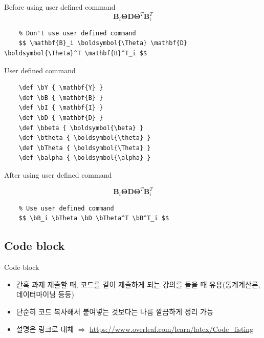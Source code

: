 \documentclass{beamer}
\begin{document}
\begin{frame}[fragile]{Before using user defined command}
	$$ \mathbf{B}_i\boldsymbol{\Theta}\mathbf{D}\boldsymbol{\Theta}^T\mathbf{B}^T_i $$
	
	\begin{lstlisting}
	% Don't use user defined command
	$$ \mathbf{B}_i \boldsymbol{\Theta} \mathbf{D} \boldsymbol{\Theta}^T \mathbf{B}^T_i $$  \end{lstlisting}
\end{frame}

\begin{frame}[fragile]{User defined command}
	\begin{lstlisting}
	\def \bY { \mathbf{Y} }
	\def \bB { \mathbf{B} }
	\def \bI { \mathbf{I} }
	\def \bD { \mathbf{D} }
	\def \bbeta { \boldsymbol{\beta} }
	\def \btheta { \boldsymbol{\theta} }
	\def \bTheta { \boldsymbol{\Theta} }
	\def \balpha { \boldsymbol{\alpha} }  \end{lstlisting}
\end{frame}

\begin{frame}[fragile]{After using user defined command}
	\def \bY {\mathbf{Y}}
	\def \bB {\mathbf{B}}
	\def \bI {\mathbf{I}}
	\def \bD {\mathbf{D}}
	\def \bbeta {\boldsymbol{\beta}}
	\def \btheta {\boldsymbol{\theta}}
	\def \bTheta {\boldsymbol{\Theta}}
	\def \balpha {\boldsymbol{\alpha}}
	
	$$ \bB_i\bTheta\bD\bTheta^T\bB^T_i $$
	
	\begin{lstlisting}
	% Use user defined command
	$$ \bB_i \bTheta \bD \bTheta^T \bB^T_i $$ \end{lstlisting}
\end{frame}


\subsection{Code block}

\begin{frame}{Code block}
	\begin{itemize}
		\item {
			간혹 과제 제출할 때, 코드를 같이 제출하게 되는 강의를 들을 때 유용(통계계산론, 데이터마이닝 등등)
		}
		\item {
			단순히 코드 복사해서 붙여넣는 것보다는 나름 깔끔하게 정리 가능
		}
		\item {
			설명은 링크로 대체 $\Rightarrow$ \url{https://www.overleaf.com/learn/latex/Code_listing}
		}
	\end{itemize}
\end{frame}
\end{document}
